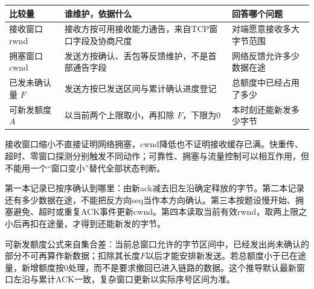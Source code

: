\begin{wideblock}

\par\medskip\noindent\begin{minipage}{\linewidth}\fontsize{9.3}{12}\selectfont\begin{tabularx}{\linewidth}{@{}YYY@{}}
\toprule\noalign{}
\begin{minipage}[b]{\linewidth}\raggedright
比较量
\end{minipage} & \begin{minipage}[b]{\linewidth}\raggedright
谁维护，依据什么
\end{minipage} & \begin{minipage}[b]{\linewidth}\raggedright
回答哪个问题
\end{minipage} \\
\midrule\noalign{}


接收窗口rwnd & 接收方按可用接收能力通告，来自TCP窗口字段及协商尺度 & 对端愿意接收多大字节范围 \\
拥塞窗口cwnd & 发送方按确认、丢包等反馈维护，不是首部通告字段 & 网络反馈允许多少数据在途 \\
已发未确认量 \(F\) & 发送方按已发送区间与累计确认进度登记 & 总额度中已经占用了多少 \\
可新发额度 \(A\) & 以当前两个上限取小，再扣除 \(F\)，下限为0 & 本时刻还能新发多少字节 \\
\bottomrule\end{tabularx}
\end{minipage}\par\medskip

\end{wideblock}

接收窗口缩小不直接证明网络拥塞，cwnd降低也不证明接收缓存已满。快重传、超时、零窗口探测分别触发不同动作；可靠性、拥塞与流量控制可以相互作用，但不能用一个``窗口变小''替代全部状态判断。

\begin{methodbox}[一次ACK事件的四本账]

第一本记录已按序确认到哪里：由新ack减去旧左沿确定释放的字节。第二本记录还有多少数据在途，不能把反方向seq当作本方向确认。第三本按题设慢开始、拥塞避免、超时或重复ACK事件更新cwnd。第四本读取当前有效rwnd，取两上限之小后再扣在途量，才得到还能新发的字节。

\end{methodbox}

可新发额度公式来自集合差：当前总窗口允许的字节区间中，已经发出尚未确认的部分不可再算作新数据；扣除其长度\(F\)以后才能安排新发送。若总额度小于已在途量，新增额度按0处理，而不是要求撤回已进入链路的数据。这个推导默认最新窗口左沿与累计ACK一致，复杂窗口更新以实际序号区间为准。

